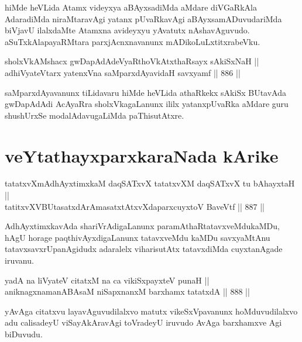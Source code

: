 \begin{artha}
hiMde heVLida Atamx videyxya aBAyxsadiMda aMdare diVGaRkAla AdaradiMda niraMtaravAgi yatanx pUvaRkavAgi aBAyxsamADuvudariMda biVjavU ilalxdaMte Atamxna avideyxyu yAvatutx nAshavAguvudo. aSuTxkAlapayaRMtara parxjAcnxnavanunx mADikoLuLxtitxrabeVku.
\end{artha}

\begin{shl}
sholxVkAMshacx gwDapAdAdeVyaRthoVkAtxthaRsayx sAkiSxNaH || \\
adhiVyateV\s tarx yatenxVna saMparxdAyavidaH savxyamf \hfill || 886 ||  
\end{shl}

\begin{artha}
saMparxdAyavanunx tiLidavaru hiMde heVLida athaRkekx sAkiSx BUtavAda gwDapAdAdi AcAyaRra sholxVkagaLanunx ililx yatanxpUvaRka aMdare guru shushUrxSe modalAdavugaLiMda paThisutAtxre.
\end{artha}

\section*{veYtathayxparxkaraNada kArike}


\begin{shl}
tatatxvXmAdhAyxtimxkaM daqSATxvX tatatxvXM daqSATxvX tu bAhayxtaH ||  \\
tatitxvXVBUtasatxdArAmasatxtAtxvXdaparxcuyxtoV BaveVtf \hfill || 887 ||  
\end{shl}

\begin{artha}
AdhAyxtimxkavAda shariVrAdigaLanunx paramAthaRtatavxveMdukaMDu, hAgU horage paqthivAyxdigaLanunx tatavxveMdu kaMDu savxyaMtAnu tatavxsavxrUpanAgidudx adaralelx viharisutAtx tatavxdiMda cuyxtanAgade iruvanu.
\end{artha}


\begin{shl}
yadA na liVyateV citatxM na ca vikiSxpayxteV punaH || \\
aniknagxnamanABAsaM niSapxnanxM barxhamx tatatxdA \hfill || 888 ||  
\end{shl}

\begin{artha}
yAvAga citatxvu layavAguvudilalxvo matutx vikeSxVpavanunx hoMduvudilalxvo adu calisadeyU viSayAkAravAgi toVradeyU iruvudo AvAga barxhamxve Agi biDuvudu.
\end{artha}


